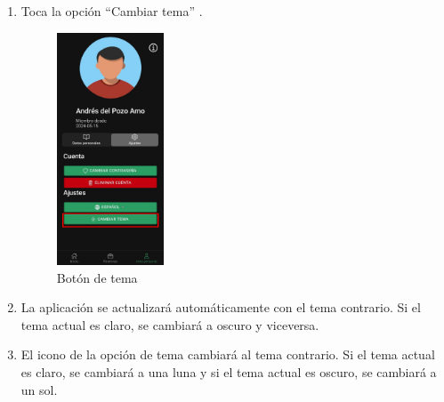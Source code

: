 \begin{enumerate}
\begin{figure}[H]
	      \end{figure}
	\item Toca la opción “Cambiar tema” .
	      \begin{figure}[H]
		      \centering
		      \includegraphics[width=0.3\textwidth]{7-Construccion/Manuales/app/P5-Tema.png}
		      \caption{Botón de tema}
	      \end{figure}

	\item La aplicación se actualizará automáticamente con el tema contrario. Si el tema actual es claro, se cambiará a oscuro y viceversa.
	\item El icono de la opción de tema cambiará al tema contrario. Si el tema actual es claro, se cambiará a una luna y si el tema actual es oscuro, se cambiará a un sol.
\end{enumerate}

